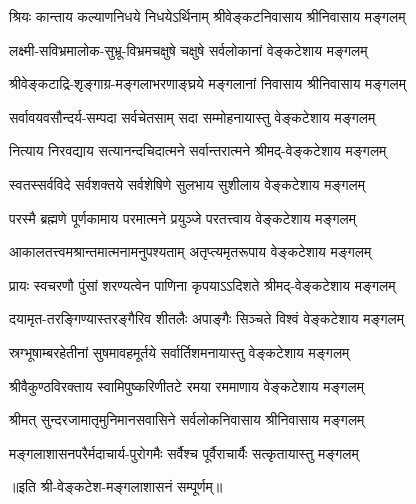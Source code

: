 
\twolineshloka
{श्रियः कान्ताय कल्याणनिधये निधयेऽर्थिनाम्}
{श्रीवेङ्कटनिवासाय श्रीनिवासाय मङ्गलम्}

\twolineshloka
{लक्ष्मी-सविभ्रमालोक-सुभ्रू-विभ्रमचक्षुषे}
{चक्षुषे सर्वलोकानां वेङ्कटेशाय मङ्गलम्}

\twolineshloka
{श्रीवेङ्कटाद्रि-शृङ्गाग्र-मङ्गलाभरणाङ्घ्रये}
{मङ्गलानां निवासाय श्रीनिवासाय मङ्गलम्}

\twolineshloka
{सर्वावयवसौन्दर्य-सम्पदा सर्वचेतसाम्}
{सदा सम्मोहनायास्तु वेङ्कटेशाय मङ्गलम्}

\twolineshloka
{नित्याय निरवद्याय सत्यानन्दचिदात्मने}
{सर्वान्तरात्मने श्रीमद्-वेङ्कटेशाय मङ्गलम्}

\twolineshloka
{स्वतस्सर्वविदे सर्वशक्तये सर्वशेषिणे}
{सुलभाय सुशीलाय वेङ्कटेशाय मङ्गलम्}

\twolineshloka
{परस्मै ब्रह्मणे पूर्णकामाय परमात्मने}
{प्रयुञ्जे परतत्त्वाय वेङ्कटेशाय मङ्गलम्}

\twolineshloka
{आकालतत्त्वमश्रान्तमात्मनामनुपश्यताम्}
{अतृप्त्यमृतरूपाय वेङ्कटेशाय मङ्गलम्}

\twolineshloka
{प्रायः स्वचरणौ पुंसां शरण्यत्वेन पाणिना}
{कृपयाऽऽदिशते श्रीमद्-वेङ्कटेशाय मङ्गलम्}

\twolineshloka
{दयामृत-तरङ्गिण्यास्तरङ्गैरिव शीतलैः}
{अपाङ्गैः सिञ्चते विश्वं वेङ्कटेशाय मङ्गलम्}

\twolineshloka
{स्रग्भूषाम्बरहेतीनां सुषमावहमूर्तये}
{सर्वार्तिशमनायास्तु वेङ्कटेशाय मङ्गलम्}

\twolineshloka
{श्रीवैकुण्ठविरक्ताय स्वामिपुष्करिणीतटे}
{रमया रममाणाय वेङ्कटेशाय मङ्गलम्}

\twolineshloka
{श्रीमत् सुन्दरजामातृमुनिमानसवासिने}
{सर्वलोकनिवासाय श्रीनिवासाय मङ्गलम्}

\twolineshloka
{मङ्गलाशासनपरैर्मदाचार्य-पुरोगमैः}
{सर्वैश्च पूर्वैराचार्यैः सत्कृतायास्तु मङ्गलम्}

॥इति श्री-वेङ्कटेश-मङ्गलाशासनं सम्पूर्णम्॥